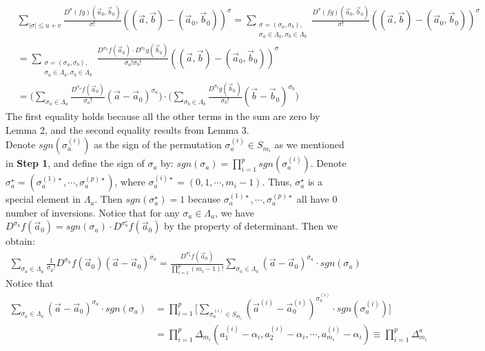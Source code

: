 \documentclass[12pt]{article}
\begin{document}
\begin{align*}
	&\sum_{|\sigma|\leqslant u+v}\frac{D^{\sigma}(fg)(\vec{a}_{0},\vec{b}_{0})}{\sigma!}((\vec{a},\vec{b})-(\vec{a}_{0},\vec{b}_{0}))^{\sigma}=\sum_{\substack{\sigma=(\sigma_{a},\sigma_{b}),\\ \sigma_{a}\in\Lambda_{a},\sigma_{b}\in\Lambda_{b}}}\frac{D^{\sigma}(fg)(\vec{a}_{0},\vec{b}_{0})}{\sigma!}((\vec{a},\vec{b})-(\vec{a}_{0},\vec{b}_{0}))^{\sigma}\\
	&=\sum_{\substack{\sigma=(\sigma_{a},\sigma_{b}),\\ \sigma_{a}\in\Lambda_{a},\sigma_{b}\in\Lambda_{b}}}\frac{D^{\sigma_{a}}f(\vec{a}_{0})\cdot D^{\sigma_{b}}g(\vec{b}_{0})}{\sigma_{a}!\sigma_{b}!}((\vec{a},\vec{b})-(\vec{a}_{0},\vec{b}_{0}))^{\sigma}\\
	&=\Big(\sum_{\sigma_{a}\in\Lambda_{a}}\frac{D^{\sigma_{a}}f(\vec{a}_{0})}{\sigma_{a}!}(\vec{a}-\vec{a}_{0})^{\sigma_{a}}\Big)\cdot\Big(\sum_{\sigma_{b}\in\Lambda_{b}} \frac{D^{\sigma_{b}}g(\vec{b}_{0})}{\sigma_{b}!}(\vec{b}-\vec{b}_{0})^{\sigma_{b}}\Big)
\end{align*}
The first equality holds because all the other terms in the sum are zero by Lemma 2, and the second equality results from Lemma 3.\\
Denote $sgn(\sigma_{a}^{(i)})$ as the sign of the permutation $\sigma_{a}^{(i)}\in S_{m_i}$ as we mentioned in \textbf{Step 1}, and define the sign of $\sigma_{a}$ by: $sgn(\sigma_{a})=\prod_{i=1}^{p}sgn(\sigma_{a}^{(i)})$. Denote $\sigma_{a}^{\star}=(\sigma_{a}^{(1)\star},\cdots,\sigma_{a}^{(p)\star})$, where $\sigma_{a}^{(i)\star}=(0,1,\cdots,m_i-1)$. Thus, $\sigma_{a}^{\star}$ is a special element in $\Lambda_{a}$. Then $sgn(\sigma_{a}^{\star})=1$ because $\sigma_{a}^{(1)\star},\cdots,\sigma_{a}^{(p)\star}$ all have $0$ number of inversions. Notice that for any $\sigma_{a}\in\Lambda_{a}$, we have $D^{\sigma_{a}}f(\vec{a}_{0})=sgn(\sigma_{a})\cdot D^{\sigma_{a}^{\star}}f(\vec{a}_{0})$ by the property of determinant. Then we obtain:
\begin{align*}
	\sum_{\sigma_{a}\in\Lambda_{a}}\frac{1}{\sigma_{a}!}D^{\sigma_{a}}f(\vec{a}_{0})(\vec{a}-\vec{a}_{0})^{\sigma_{a}}=\frac{D^{\sigma_{a}^{\star}}f(\vec{a}_{0})}{\prod_{i=1}^{p}(m_{i}-1)!}\sum_{\sigma_{a}\in\Lambda_{a}}(\vec{a}-\vec{a}_{0})^{\sigma_{a}}\cdot sgn(\sigma_{a})
\end{align*}
Notice that 
\begin{align*}
	\sum_{\sigma_{a}\in\Lambda_{a}}(\vec{a}-\vec{a}_{0})^{\sigma_{a}}\cdot sgn(\sigma_{a})&=\prod_{i=1}^{p}\Big[\sum_{\sigma_{a}^{(i)}\in S_{m_i}}(\vec{a}^{(i)}-\vec{a}_{0}^{(i)})^{\sigma_{a}^{(i)}}\cdot sgn(\sigma_{a}^{(i)})\Big]\\
	&=\prod_{i=1}^{p}\Delta_{m_i}(a_{1}^{(i)}-\alpha_{i},a_{2}^{(i)}-\alpha_{i},\cdots,a_{m_i}^{(i)}-\alpha_{i})\equiv\prod_{i=1}^{p}\Delta_{m_i}^{a}
\end{align*}
\end{document}
